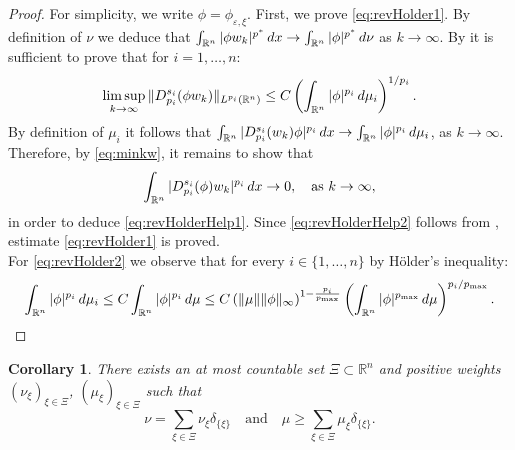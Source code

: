 \documentclass[11pt]{amsart}
\theoremstyle{plain}
\newtheorem{corollary}[theorem]{Corollary}
\theoremstyle{definition}
\numberwithin{equation}{section}
\renewcommand{\d}{\textnormal{d}}
\newcommand{\R}{\mathbb{R}}
\newcommand{\eps}{\varepsilon}
\begin{document}
\begin{proof}
For simplicity, we write $\phi = \phi_{\eps,\xi}$. First, we prove \eqref{eq:revHolder1}. By definition of $\nu$ we deduce that $\int_{\R^n} \vert \phi w_k \vert^{p^{\ast}}  \, \d x \to \int_{\R^n} \vert \phi \vert^{p^{\ast}}  \, \d \nu$ as $k \to \infty$. By  it is sufficient to prove that for $i = 1,\dots,n$:
\begin{equation}
\label{eq:revHolderHelp1}
\limsup\limits_{k \to \infty} \Vert D^{s_i}_{p_i}(\phi w_k)\Vert_{L^{p_i}(\R^n)} \le C\left(\int_{\R^n} \vert\phi\vert^{p_i}  \, \d \mu_i \right)^{1/p_i}.
\end{equation}
By definition of $\mu_i$ it follows that $\int_{\R^n} \vert D^{s_i}_{p_i}(w_k) \phi \vert^{p_i}  \, \d x \to \int_{\R^n} \vert\phi\vert^{p_i}  \,\d \mu_i$, as $k \to \infty$. Therefore, by \eqref{eq:minkw}, it remains to show that
\begin{equation}
\label{eq:revHolderHelp2}
\int_{\R^n} \vert D^{s_i}_{p_i}(\phi)w_k \vert^{p_i}  \, \d x \to 0, ~~ \text{ as } k \to \infty,
\end{equation}
in order to deduce \eqref{eq:revHolderHelp1}. Since \eqref{eq:revHolderHelp2} follows from , estimate \eqref{eq:revHolder1} is proved.\\
For \eqref{eq:revHolder2} we observe that for every $i \in \{1,\dots,n\}$ by H\" older's inequality:
\begin{equation*}
\int_{\R^n} \vert\phi\vert^{p_i}  \, \d \mu_i \le C \int_{\R^n} \vert\phi\vert^{p_i}  \, \d \mu \le C \left(\Vert \mu \Vert\Vert\phi\Vert_{\infty}\right)^{1-\frac{p_i}{p_{\max}}} \left( \int_{\R^n} \vert \phi \vert^{p_{\max}}  \, \d \mu \right)^{p_i/p_{\max}}.
\end{equation*}
\end{proof}


\begin{corollary}
\label{cor:CC}
There exists an at most countable set $\Xi \subset \R^n$ and positive weights $(\nu_{\xi})_{\xi \in \Xi}$, $(\mu_{\xi})_{\xi \in \Xi}$ such that
\begin{equation*}
\nu = \sum_{\xi \in \Xi} \nu_{\xi}\delta_{\{\xi\}} \quad\text{and}\quad \mu \ge \sum_{\xi \in \Xi} \mu_{\xi}\delta_{\{\xi\}}.
\end{equation*}
\end{corollary}
\end{document}
